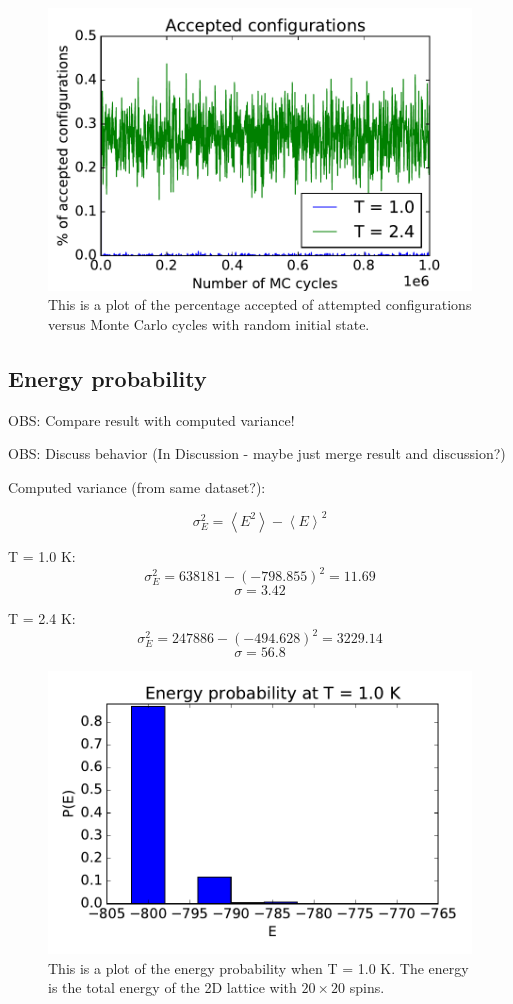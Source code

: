 \begin{figure}[H]
\includegraphics[width=\linewidth]{../results/4c/L_20_accepted_configs}\caption{This is a plot of the percentage accepted of attempted configurations versus  Monte Carlo cycles with random initial state.}\label{fig:percentage_accepted}
\end{figure}

\subsection{Energy probability}

OBS: Compare result with computed variance!

OBS: Discuss behavior (In Discussion - maybe just merge result and discussion?)

Computed variance (from same dataset?):

$$ \sigma_E^2 = \left< E^2\right> - \left< E\right>^2 $$

T = 1.0 K:
$$ \sigma_E^2 = 638181 - (-798.855)^2 = 11.69 $$
$$ \sigma = 3.42 $$

T = 2.4 K:
$$ \sigma_E^2 =   247886 - (-494.628)^2 = 3229.14 $$
$$ \sigma = 56.8  $$

\begin{figure}[H]
\includegraphics[width=\linewidth]{../results/4d/d_T_1probability}\caption{This is a plot of the energy probability when T = 1.0 K. The energy is the total energy of the 2D lattice with $20\times 20$ spins.}\label{fig:probability_T_1.0}
\end{figure}

